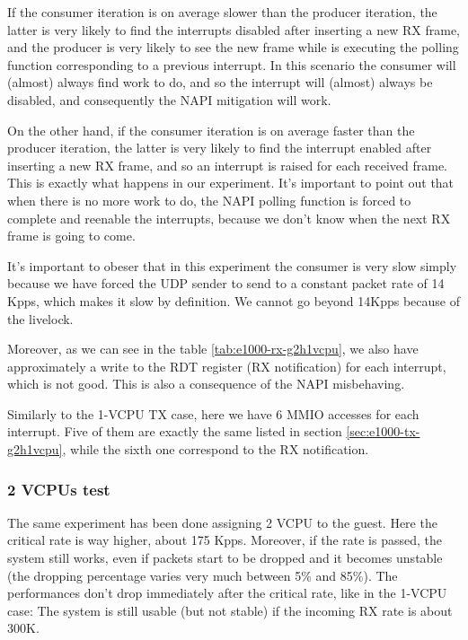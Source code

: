 If the consumer iteration is on average slower than the producer iteration, the latter is very likely to find the interrupts disabled
after inserting a new RX frame, and the producer is very likely to see the new frame while is executing the polling function corresponding
to a previous interrupt. In this scenario the consumer will (almost) always find work to do, and so the interrupt will (almost) always
be disabled, and consequently the NAPI mitigation will work.

On the other hand, if the consumer iteration is on average faster than the producer iteration, the latter is very likely to find the
interrupt enabled after inserting a new RX frame, and so an interrupt is raised for each received frame. This is exactly what happens
in our experiment. It's important to point out that when there is no more work to do, the NAPI polling function is forced to complete 
and reenable the interrupts, because we don't know when the next RX frame is going to come.

It's important to obeser that in this experiment the consumer is very slow simply because we have forced the UDP sender to send to a 
constant packet rate of 14 Kpps, which makes it slow by definition. We cannot go beyond 14Kpps because of the livelock.

\vspace{0.5cm}

Moreover, as we can see in the table \ref{tab:e1000-rx-g2h1vcpu}, we also have approximately a write to the RDT register (RX 
notification) for each interrupt, which is not good. This is also a consequence of the NAPI misbehaving.

Similarly to the 1-VCPU TX case, here we have 6 MMIO accesses for each interrupt. Five of them are exactly the same listed in
section \ref{sec:e1000-tx-g2h1vcpu}, while the sixth one correspond to the RX notification.


\subsubsection{2 VCPUs test}
The same experiment has been done assigning 2 VCPU to the guest. Here the critical rate is way higher, about 175 Kpps. Moreover,
if the rate is passed, the system still works, even if packets start to be dropped and it becomes unstable (the dropping percentage
varies very much between 5\% and 85\%). The performances don't drop immediately after the critical rate, like in the 1-VCPU case: The system
is still usable (but not stable) if the incoming RX rate is about 300K.

